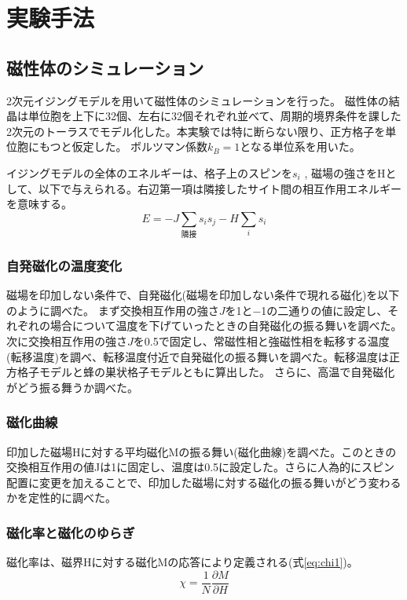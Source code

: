 \documentclass[11pt,a4]{jarticle}
\begin{document}

\section{実験手法}
\subsection{磁性体のシミュレーション}
2次元イジングモデルを用いて磁性体のシミュレーションを行った。
磁性体の結晶は単位胞を上下に32個、左右に32個それぞれ並べて、周期的境界条件を課した2次元のトーラスでモデル化した。本実験では特に断らない限り、正方格子を単位胞にもつと仮定した。
ボルツマン係数$k_B=1$となる単位系を用いた。

イジングモデルの全体のエネルギーは、格子上のスピンを$s_i$ , 磁場の強さをHとして、以下で与えられる。右辺第一項は隣接したサイト間の相互作用エネルギーを意味する。
\begin{equation}
E = -J \sum_{隣接} s_i s_j -  H \sum_{i} s_i 
\end{equation}

\subsubsection{自発磁化の温度変化}
磁場を印加しない条件で、自発磁化(磁場を印加しない条件で現れる磁化)を以下のように調べた。
まず交換相互作用の強さ$J$を1と−1の二通りの値に設定し、それぞれの場合について温度を下げていったときの自発磁化の振る舞いを調べた。
次に交換相互作用の強さ$J$を0.5で固定し、常磁性相と強磁性相を転移する温度(転移温度)を調べ、転移温度付近で自発磁化の振る舞いを調べた。転移温度は正方格子モデルと蜂の巣状格子モデルともに算出した。
さらに、高温で自発磁化がどう振る舞うか調べた。

\subsubsection{磁化曲線}
印加した磁場Hに対する平均磁化Mの振る舞い(磁化曲線)を調べた。このときの交換相互作用の値Jは1に固定し、温度は0.5に設定した。さらに人為的にスピン配置に変更を加えることで、印加した磁場に対する磁化の振る舞いがどう変わるかを定性的に調べた。

\subsubsection{磁化率と磁化のゆらぎ}

磁化率は、磁界Hに対する磁化Mの応答により定義される(式\ref{eq:chi1})。
\begin{equation}
\chi = \frac{1}{N} \frac{\partial M}{\partial H}
  \label{eq:chi1}
\end{equation}
\end{document}
